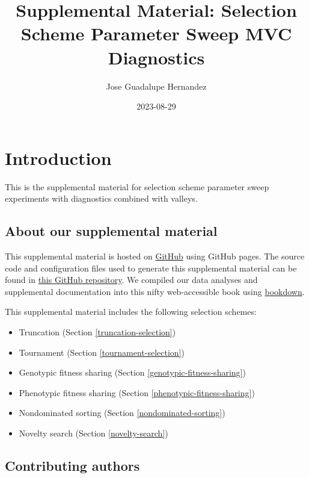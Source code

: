 \documentclass[]{book}
\title{Supplemental Material: Selection Scheme Parameter Sweep MVC Diagnostics}
\author{Jose Guadalupe Hernandez}
\date{2023-08-29}
\providecommand{\tightlist}{%
  \setlength{\itemsep}{0pt}\setlength{\parskip}{0pt}}
\begin{document}
\maketitle

{
\setcounter{tocdepth}{1}
\tableofcontents
}
\hypertarget{introduction}{%
\chapter{Introduction}\label{introduction}}

This is the supplemental material for selection scheme parameter sweep experiments with diagnostics combined with valleys.

\hypertarget{about-our-supplemental-material}{%
\section{About our supplemental material}\label{about-our-supplemental-material}}

This supplemental material is hosted on \href{https://github.com}{GitHub} using GitHub pages.
The source code and configuration files used to generate this supplemental material can be found in \href{https://github.com/jgh9094/ECJ-2023-Suite-Of-Diagnostic-Metrics-For-Characterizing-Selection-Schemes}{this GitHub repository}.
We compiled our data analyses and supplemental documentation into this nifty web-accessible book using \href{https://bookdown.org/}{bookdown}.

This supplemental material includes the following selection schemes:

\begin{itemize}
\tightlist
\item
  Truncation (Section \ref{truncation-selection})
\item
  Tournament (Section \ref{tournament-selection})
\item
  Genotypic fitness sharing (Section \ref{genotypic-fitness-sharing})
\item
  Phenotypic fitness sharing (Section \ref{phenotypic-fitness-sharing})
\item
  Nondominated sorting (Section \ref{nondominated-sorting})
\item
  Novelty search (Section \ref{novelty-search})
\end{itemize}

\hypertarget{contributing-authors}{%
\section{Contributing authors}\label{contributing-authors}}
\end{document}
